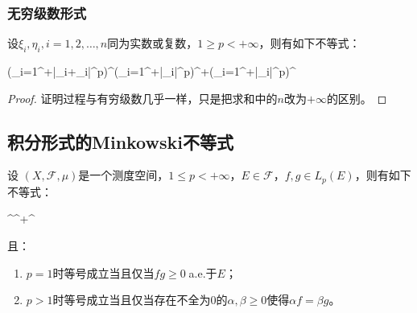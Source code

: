 \subsubsection{无穷级数形式}
设$\xi_i,\eta_i,i=1,2,\dots,n$同为实数或复数，$1\geqslant p<+\infty$，则有如下不等式：
\begin{inequality*}\label{ineq:minkowski-ineq-infty-series}
	\left(\sum_{i=1}^{+\infty}|\xi_i+\eta_i|^p\right)^\leqslant\left(\sum_{i=1}^{+\infty}|\xi_i|^p\right)^+\left(\sum_{i=1}^{+\infty}|\eta_i|^p\right)^
\end{inequality*}
\begin{proof}
	证明过程与有穷级数几乎一样，只是把求和中的$n$改为$+\infty$的区别。
\end{proof}

\subsection{积分形式的Minkowski不等式}
\begin{theorem}
	设	$(X,\mathscr{F},\mu)$是一个测度空间，$1\leqslant p<+\infty$，$E\in\mathscr{F}$，$f,g\in L_p(E)$，则有如下不等式：
	\begin{inequality*}\label{ineq:minkowski-ineq-Lebesgue}
		^\leqslant{}^+^
	\end{inequality*}
	且：
	\begin{enumerate}
		\item $p=1$时等号成立当且仅当$fg\geqslant0\;$a.e.于$E$；
		\item $p>1$时等号成立当且仅当存在不全为$0$的$\alpha,\beta\geqslant0$使得$\alpha f=\beta g$。
	\end{enumerate}
\end{theorem}
